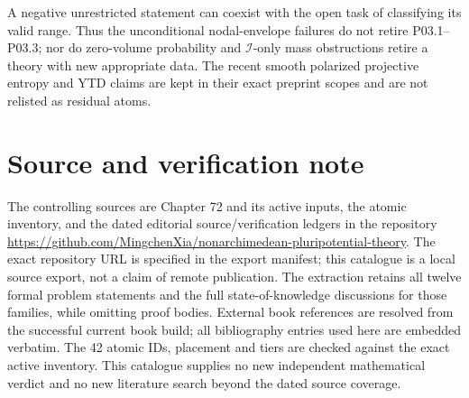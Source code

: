 \documentclass[11pt,a4paper]{article}
\theoremstyle{definition}
\theoremstyle{remark}
\begin{document}
A negative unrestricted statement can coexist with the open task of
classifying its valid range. Thus the unconditional nodal-envelope failures
do not retire P03.1--P03.3; nor do zero-volume probability and
\(\mathcal I\)-only mass obstructions retire a theory with new appropriate
data. The recent smooth polarized projective entropy and YTD claims are
kept in their exact preprint scopes and are not relisted as residual atoms.

\section*{Source and verification note}
The controlling sources are Chapter 72 and its active inputs, the atomic
inventory, and the dated editorial source/verification ledgers in the
repository \url{https://github.com/MingchenXia/nonarchimedean-pluripotential-theory}.
The exact repository URL is specified in the export manifest; this catalogue
is a local source export, not a claim of remote publication.
The extraction retains all twelve formal problem statements and the full
state-of-knowledge discussions for those families, while omitting proof
bodies. External book references are resolved from the successful current
book build; all bibliography entries used here are embedded verbatim.
The 42 atomic IDs, placement and tiers are checked against the exact active
inventory. This catalogue supplies no new independent mathematical verdict
and no new literature search beyond the dated source coverage.
\end{document}
